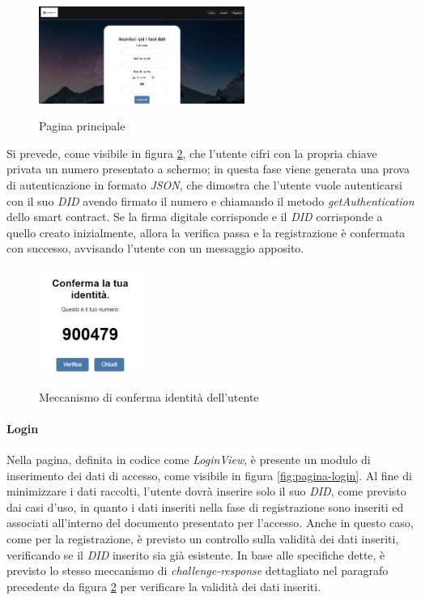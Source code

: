 \begin{figure}[h]
    \centering
    \includegraphics[width=0.6\textwidth, alt={Pagina principale dell'applicazione}]{immagini/frontend/register.png}
    \caption{Pagina principale} \label{fig:pagina-registrazione}
\end{figure}

Si prevede, come visibile in figura \ref{fig:sfida}, che l'utente cifri con la propria chiave privata un numero presentato a schermo;
in questa fase viene generata una prova di autenticazione in formato \textit{JSON}, che dimostra che l'utente vuole autenticarsi con il suo \textit{DID} avendo firmato il numero
e chiamando il metodo \textit{getAuthentication} dello smart contract.
Se la firma digitale corrisponde e il \textit{DID} corrisponde a quello creato inizialmente, allora la verifica passa e la registrazione è confermata con successo, 
avvisando l'utente con un messaggio apposito. 

\begin{figure}[h]
    \centering
    \includegraphics[width=0.3\textwidth, alt={Meccanismo di sfida per conferma dell'identità dell'utente}]{immagini/frontend/challenge-response.png}
    \caption{Meccanismo di conferma identità dell'utente} \label{fig:sfida}
\end{figure}

\newpage
\paragraph{Login}
Nella pagina, definita in codice come \textit{LoginView}, è presente un modulo di inserimento dei dati di accesso, come visibile in figura \ref{fig:pagina-login}.
Al fine di minimizzare i dati raccolti, l'utente dovrà inserire solo il suo \textit{DID}, come previsto dai casi d'uso, 
in quanto i dati inseriti nella fase di registrazione sono inseriti ed associati all'interno del documento presentato per l'accesso.
Anche in questo caso, come per la registrazione, è previsto un controllo sulla validità dei dati inseriti, verificando se il \textit{DID} inserito sia già esistente.
In base alle specifiche dette, è previsto lo stesso meccanismo di \textit{challenge-response} dettagliato nel paragrafo precedente da figura \ref{fig:sfida}
per verificare la validità dei dati inseriti.

